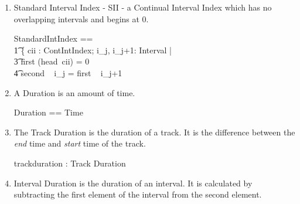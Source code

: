\documentclass[11pt]{article}
\begin{document}
\begin{enumerate}
\begin{zed}
	ContIntIndex == \\
	\t1 \{ ii : IntervalIndex;  i_j, i_{j+1}: Interval  |   \\
 	\t3 \langle i_j, i_{j+1} \rangle \inseq ii \implies  second ~ i_j \geq first ~ i_{j+1}@ ii \}
 \end{zed}

\item \textsf{Standard Interval Index - SII} - a Continual Interval Index which has no overlapping intervals and begins at 0. 

\begin{zed}
	StandardIntIndex == \\
	\t1 \{ cii : ContIntIndex; i_j, i_{j+1}: Interval | \\
	\t3 first (head~cii) = 0 \land \\
	\t4 second ~ i_j = first ~ i_{j+1}
\end{zed}



\item A \textsf{Duration} is an amount of time. 

\begin{zed}
	Duration == Time
\end{zed}

\item The \textsf{Track Duration} is the duration of a track. It is the difference between the \emph{end} time and \emph{start} time of the track. 

\begin{axdef}
	trackduration : Track \fun Duration 
\end{axdef}

\item \textsf{Interval Duration} is the duration of an interval. It is calculated by subtracting the first element of the interval from the second element. 


\end{enumerate}
\end{document}
